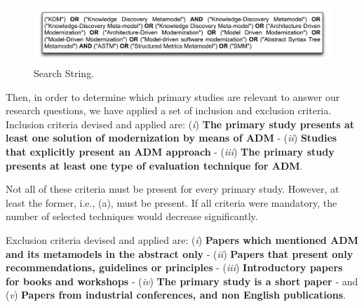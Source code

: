 \begin{figure}[!h]
\centering
  \includegraphics[scale=0.35]{figuras/SearchStringADM}
\caption{Search String.}
\label{search_string}
\end{figure} 

Then, in order to determine which primary studies are relevant to answer our research questions, we have applied a set of inclusion and exclusion criteria. Inclusion criteria devised and applied are: (\textit{i}) \textbf{The primary study presents at least one solution of modernization by means of ADM} - (\textit{ii}) \textbf{Studies that explicitly present an ADM approach} - (\textit{iii}) \textbf{The primary study presents at least one type of evaluation technique for ADM}.  





Not all of these criteria must be present for every primary study. However, at least the former, i.e., (a), must be present. If all criteria were mandatory, the number of selected techniques would decrease significantly.

Exclusion criteria devised and applied are: (\textit{i}) \textbf{Papers which mentioned ADM and its metamodels in the abstract only} - (\textit{ii}) \textbf{Papers that present only recommendations, guidelines or principles} - (\textit{iii}) \textbf{Introductory papers for books and workshops} - (\textit{iv}) \textbf{The primary study is a short paper} - and (\textit{v}) \textbf{Papers from industrial conferences, and non English publications}. 

